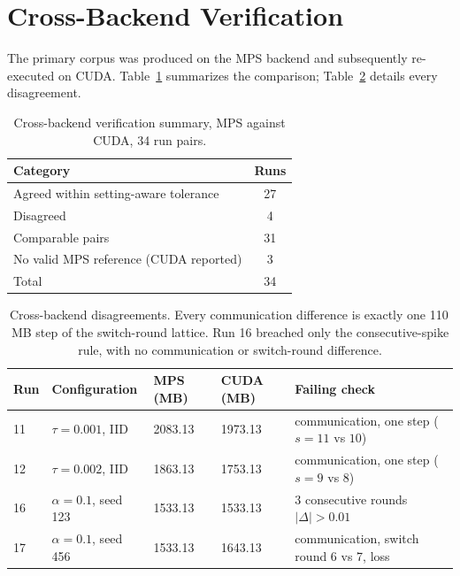 \section{Cross-Backend Verification}
\label{app:crossbackend}

The primary corpus was produced on the MPS backend and subsequently re-executed on CUDA. Table~\ref{tab:n3a} summarizes the comparison; Table~\ref{tab:n3b} details every disagreement.

\begin{table}[!t]
\caption{Cross-backend verification summary, MPS against CUDA, 34 run pairs.}
\label{tab:n3a}
\begin{center}
\small
\setlength{\tabcolsep}{4pt}
\begin{tabular}{lc}
\toprule
Category & Runs \\
\midrule
Agreed within setting-aware tolerance & 27 \\
Disagreed & \phantom{0}4 \\
\midrule
Comparable pairs & 31 \\
No valid MPS reference (CUDA reported) & \phantom{0}3 \\
\midrule
Total & 34 \\
\bottomrule
\end{tabular}
\end{center}
\end{table}

\begin{table}[!t]
\caption{Cross-backend disagreements. Every communication difference is exactly one 110\,MB step of the switch-round lattice. Run 16 breached only the consecutive-spike rule, with no communication or switch-round difference.}
\label{tab:n3b}
\begin{center}
\scriptsize
\setlength{\tabcolsep}{3pt}
\begin{tabular}{@{}llp{}p{}p{}@{}}
\toprule
Run & Configuration & MPS (MB) & CUDA (MB) & Failing check \\
\midrule
11 & $\tau{=}0.001$, IID & 2083.13 & 1973.13 & communication, one step ($s{=}11$ vs $10$) \\
12 & $\tau{=}0.002$, IID & 1863.13 & 1753.13 & communication, one step ($s{=}9$ vs $8$) \\
16 & $\alpha{=}0.1$, seed 123 & 1533.13 & 1533.13 & 3 consecutive rounds $|\Delta|>0.01$ \\
17 & $\alpha{=}0.1$, seed 456 & 1533.13 & 1643.13 & communication, switch round 6 vs 7, loss \\
\bottomrule
\end{tabular}
\end{center}
\end{table}

